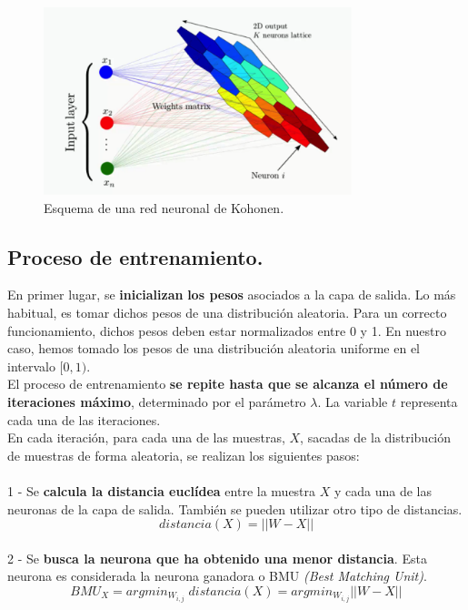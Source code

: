 \begin{figure}
\centering
\includegraphics[width=0.8\textwidth]{imagenes/arquitectura_som.png}

\caption{Esquema de una red neuronal de Kohonen.}
\end{figure}

\subsection{Proceso de entrenamiento.}

En primer lugar, se \textbf{inicializan} \textbf{los pesos} asociados a la capa de salida. Lo más habitual, es tomar dichos pesos de una distribución aleatoria.
Para un correcto funcionamiento, dichos pesos deben estar normalizados entre 0 y 1. En nuestro caso, hemos tomado los pesos de una distribución aleatoria uniforme en el intervalo $[0, 1)$.\\

El proceso de entrenamiento \textbf{se repite hasta que se alcanza el número de iteraciones máximo}, determinado por el parámetro $\lambda$. La variable $t$ representa cada una de las iteraciones.\\

En cada iteración, para cada una de las muestras, $X$, sacadas de la distribución de muestras de forma aleatoria, se realizan los siguientes pasos: \\\\
1 - Se \textbf{calcula la distancia euclídea} entre la muestra $X$ y cada una de las neuronas de la capa de salida. También se pueden utilizar otro tipo de distancias.\\
$$distancia(X) = || W - X ||$$\\
2 - Se \textbf{busca la neurona que ha obtenido una menor distancia}. Esta neurona es considerada la neurona ganadora o BMU \textit{(Best Matching Unit)}.\\
$$BMU_X = argmin_{W_{i, j}} \; distancia(X) = argmin_{W_{i, j}} || W - X ||$$\\


